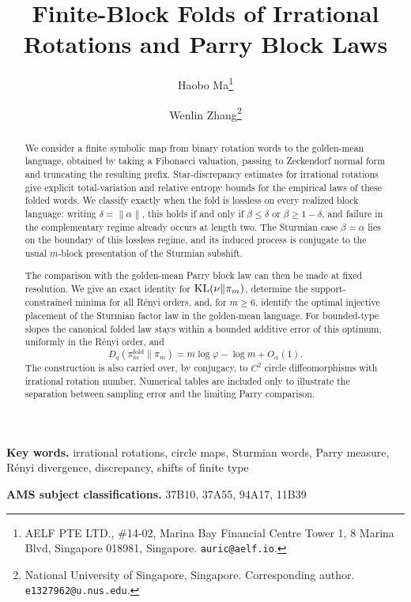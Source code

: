 \documentclass[11pt,letterpaper]{article}
\title{Finite-Block Folds of Irrational Rotations and Parry Block Laws} \author{Haobo Ma\thanks{AELF PTE LTD., \#14-02, Marina Bay Financial Centre Tower 1, 8 Marina Blvd, Singapore 018981, Singapore. \texttt{auric@aelf.io}.} \and Wenlin Zhang\thanks{National University of Singapore, Singapore. Corresponding author. \texttt{e1327962@u.nus.edu}.}} \date{}
\numberwithin{equation}{section}
\theoremstyle{plain} \newtheorem{theorem}{Theorem}[section] \newtheorem{lemma}[theorem]{Lemma} \newtheorem{proposition}[theorem]{Proposition} \newtheorem{corollary}[theorem]{Corollary} \theoremstyle{definition} \newtheorem{definition}[theorem]{Definition} \theoremstyle{remark} \newtheorem{remark}[theorem]{Remark}
\begin{document}
 \maketitle

\begin{abstract} We consider a finite symbolic map from binary rotation words to the golden-mean language, obtained by taking a Fibonacci valuation, passing to Zeckendorf normal form and truncating the resulting prefix.  Star-discrepancy estimates for irrational rotations give explicit total-variation and relative entropy bounds for the empirical laws of these folded words.  We classify exactly when the fold is lossless on every realized block language: writing \(\delta=\|\alpha\|\), this holds if and only if \(\beta\le\delta\) or \(\beta\ge1-\delta\), and failure in the complementary regime already occurs at length two.  The Sturmian case \(\beta=\alpha\) lies on the boundary of this lossless regime, and its induced process is conjugate to the usual \(m\)-block presentation of the Sturmian subshift.

The comparison with the golden-mean Parry block law can then be made at fixed resolution.  We give an exact identity for \(\operatorname{KL}(\nu\|\pi_m)\), determine the support-constrained minima for all R\'enyi orders, and, for \(m\ge 6\), identify the optimal injective placement of the Sturmian factor law in the golden-mean language.  For bounded-type slopes the canonical folded law stays within a bounded additive error of this optimum, uniformly in the R\'enyi order, and \[ D_q(\pi_m^{\mathrm{fold}}\|\pi_m)=m\log\varphi-\log m+O_\alpha(1). \] The construction is also carried over, by conjugacy, to \(C^2\) circle diffeomorphisms with irrational rotation number.  Numerical tables are included only to illustrate the separation between sampling error and the limiting Parry comparison. \end{abstract}

\medskip \noindent\textbf{Key words.} irrational rotations, circle maps, Sturmian words, Parry measure, R\'enyi divergence, discrepancy, shifts of finite type

\medskip \noindent\textbf{AMS subject classifications.} 37B10, 37A55, 94A17, 11B39

        

 
\end{document}
